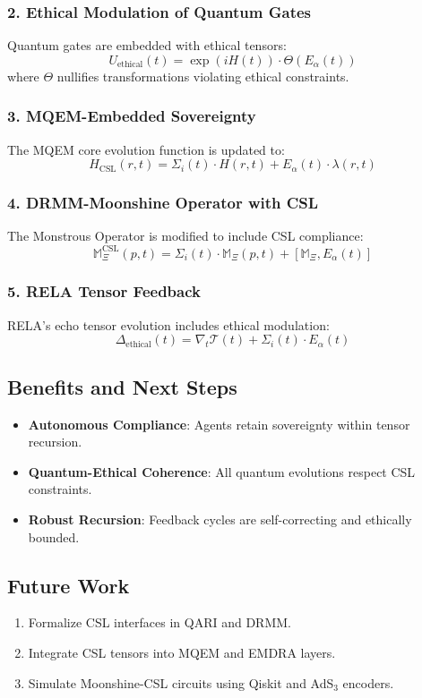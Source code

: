\documentclass[12pt]{article}
\begin{document}
\subsubsection*{2. Ethical Modulation of Quantum Gates}
Quantum gates are embedded with ethical tensors:
\[
U_{\text{ethical}}(t) = \exp(iH(t)) \cdot \Theta(E_\alpha(t))
\]
where $\Theta$ nullifies transformations violating ethical constraints.

\subsubsection*{3. MQEM-Embedded Sovereignty}
The MQEM core evolution function is updated to:
\[
H_{\text{CSL}}(r, t) = \Sigma_i(t) \cdot H(r, t) + E_\alpha(t) \cdot \lambda(r, t)
\]

\subsubsection*{4. DRMM-Moonshine Operator with CSL}
The Monstrous Operator is modified to include CSL compliance:
\[
\mathbb{M}_\Xi^{\text{CSL}}(p, t) = \Sigma_i(t) \cdot \mathbb{M}_\Xi(p, t) + [\mathbb{M}_\Xi, E_\alpha(t)]
\]

\subsubsection*{5. RELA Tensor Feedback}
RELA’s echo tensor evolution includes ethical modulation:
\[
\Delta_{\text{ethical}}(t) = \nabla_t \mathcal{T}(t) + \Sigma_i(t) \cdot E_\alpha(t)
\]

\subsection{Benefits and Next Steps}

\begin{itemize}
  \item \textbf{Autonomous Compliance}: Agents retain sovereignty within tensor recursion.
  \item \textbf{Quantum-Ethical Coherence}: All quantum evolutions respect CSL constraints.
  \item \textbf{Robust Recursion}: Feedback cycles are self-correcting and ethically bounded.
\end{itemize}

\subsection*{Future Work}
\begin{enumerate}
  \item Formalize CSL interfaces in QARI and DRMM.
  \item Integrate CSL tensors into MQEM and EMDRA layers.
  \item Simulate Moonshine-CSL circuits using Qiskit and AdS$_3$ encoders.
\end{enumerate}
\end{document}
